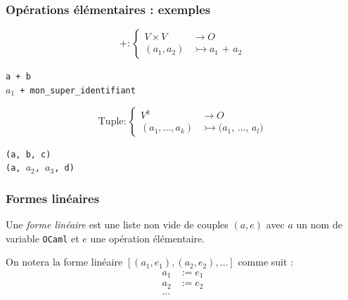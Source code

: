 \begin{frame}
    \frametitle{Opérations élémentaires : exemples}

    \begin{minipage}{0.5\textwidth}
        $$
            \texttt{+} : \left\{
            \begin{aligned}
                V \times V & \rightarrow O                        \\
                (a_1, a_2) & \rightarrowtail a_1 \texttt{ + } a_2
            \end{aligned} \right.
        $$
    \end{minipage}%
    \begin{minipage}{0.5\textwidth}
        \texttt{a + b} \\
        \texttt{$a_1$ + mon\_super\_identifiant}
    \end{minipage}

    \pause

    \begin{minipage}{0.6\textwidth}
        $$
            \text{Tuple} : \left\{
            \begin{aligned}
                V^k                & \rightarrow O                                                                \\
                (a_1, \ldots, a_k) & \rightarrowtail \texttt{(} a_1 \texttt{, } \ldots \texttt{, } a_l \texttt{)}
            \end{aligned} \right.
        $$
    \end{minipage}%
    \begin{minipage}{0.4\textwidth}
        \texttt{(a, b, c)} \\
        \texttt{(a, $a_2$, $a_3$, d)}
    \end{minipage}

\end{frame}

\begin{frame}[t]
    \frametitle{Formes linéaires}

    \begin{definition}
        Une \textit{forme linéaire} est une liste non vide de couples $(a, e)$ avec $a$
        un nom de variable \texttt{OCaml} et $e$ une opération élémentaire.
    \end{definition}

    \pause

    On notera la forme linéaire $[(a_1, e_1), (a_2, e_2), \ldots]$ comme suit :
    \begin{align*}
        a_1 & := e_1 \\
        a_2 & := e_2 \\
        \ldots
    \end{align*}
\end{frame}

